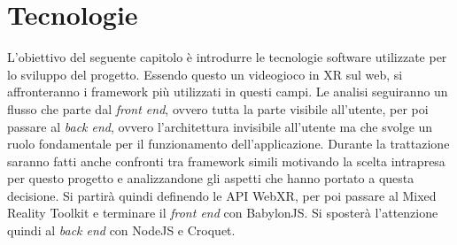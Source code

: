 \chapter{Tecnologie}\label{chap:Tecnologie}
L'obiettivo del seguente capitolo è introdurre le tecnologie software utilizzate per lo sviluppo del progetto. Essendo questo un videogioco in XR sul web, si affronteranno i framework
più utilizzati in questi campi. Le analisi seguiranno un flusso che parte dal \textit{front end}, ovvero tutta la parte visibile all'utente, per poi passare al \textit{back end}, ovvero
l'architettura invisibile all'utente ma che svolge un ruolo fondamentale per il funzionamento dell'applicazione. Durante la trattazione saranno fatti anche confronti tra
framework simili motivando la scelta intrapresa per questo progetto e analizzandone gli aspetti che hanno portato a questa decisione. Si partirà quindi definendo le API WebXR, per poi
passare al Mixed Reality Toolkit e terminare il \textit{front end} con BabylonJS. Si sposterà l'attenzione quindi al \textit{back end} con NodeJS e Croquet. 

